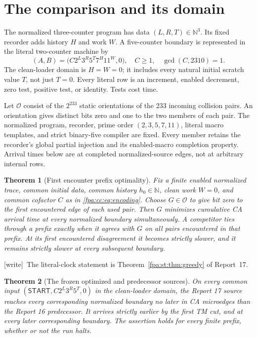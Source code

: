 \documentclass[11pt,a4paper]{article}
\numberwithin{equation}{section}
\newtheorem{theorem}{Theorem}[section]
\newcommand{\N}{\mathbb N}\newcommand{\Z}{\mathbb Z}\newcommand{\R}{\mathbb R}
\newcommand{\START}{\mathsf{START}}
\newcommand{\wtag}{\textup{[write]}}
\begin{document}
\section{The comparison and its domain}\label{fpa:rep:18:first}
\label{fpa:cc:sec:main}
The normalized three-counter program has data $(L,R,T)\in\N^3$. Its fixed
recorder adds history $H$ and work $W$. A five-counter boundary is represented
in the literal two-counter machine by
\begin{equation}
 (A,B)=\bigl(C2^L3^R5^T7^H11^W,0\bigr),\quad
 C\geq1,\quad \gcd(C,2310)=1.
 \label{fpa:cc:eq:encoding}
\end{equation}
The clean-loader domain is $H=W=0$; it includes every natural initial
scratch value $T$, not just $T=0$. Every literal row is an increment,
enabled decrement, zero test, positive test, or identity. Tests cost time.

Let $\mathcal O$ consist of the $2^{233}$ static orientations of the 233
incoming collision pairs. An orientation gives distinct bits zero and one
to the two members of each pair. The normalized program, recorder,
prime order $(2,3,5,7,11)$, literal macro templates, and strict binary-five
compiler are fixed. Every member retains the recorder's global partial
injection and its enabled-macro completion property. Arrival times below
are at completed normalized-source edges, not at arbitrary internal rows.

\begin{theorem}[First encounter prefix optimality]
\label{fpa:cc:thm:optimal}
Fix a finite enabled normalized trace, common initial data, common history
$h_0\in\N$, clean work $W=0$, and common cofactor $C$ as in
\eqref{fpa:cc:eq:encoding}. Choose $G\in\mathcal O$ to give bit zero to the first
encountered edge of each used pair. Then $G$ minimizes cumulative CA arrival
time at every normalized boundary simultaneously. A competitor ties through
a prefix exactly when it agrees with $G$ on all pairs encountered in that
prefix. At its first encountered disagreement it becomes strictly slower,
and it remains strictly slower at every subsequent boundary.
\end{theorem}

\wtag\ The literal-clock statement is Theorem~\ref{fpa:st:thm:greedy} of Report~17.

\begin{theorem}[The frozen optimized and predecessor sources]
\label{fpa:cc:thm:oldnew}
On every common input $(\START,C2^L3^R5^T,0)$ in the clean-loader domain,
the Report 17 source reaches every corresponding normalized boundary no
later in CA microedges than the Report 16 predecessor. It arrives strictly
earlier by the first TM cut, and at every later corresponding boundary.
The assertion holds for every finite prefix, whether or not the run halts.
\end{theorem}
\end{document}
